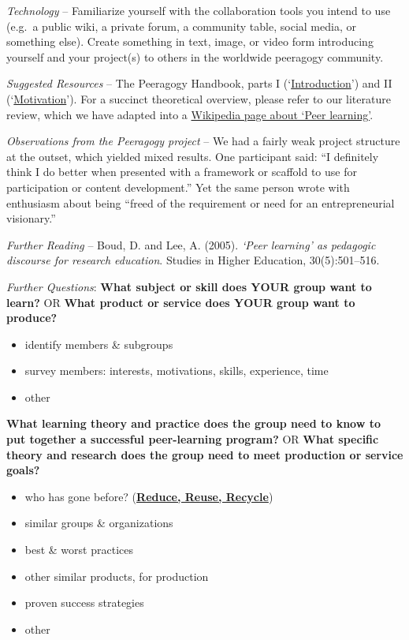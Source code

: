 \emph{Technology} -- Familiarize yourself with the collaboration tools
you intend to use (e.g.~a public wiki, a private forum, a community
table, social media, or something else). Create something in text,
image, or video form introducing yourself and your project(s) to others
in the worldwide peeragogy community.

\emph{Suggested Resources} -- The Peeragogy Handbook, parts I
(`\href{http://peeragogy.org/}{Introduction}') and II
(`\href{http://peeragogy.org/motivation/}{Motivation}'). For a succinct
theoretical overview, please refer to our literature review, which we
have adapted into a
\href{http://en.wikipedia.org/wiki/Peer_learning}{Wikipedia page about
`Peer learning'}.

\emph{Observations from the Peeragogy project} -- We had a fairly weak
project structure at the outset, which yielded mixed results. One
participant said: ``I definitely think I do better when presented with a
framework or scaffold to use for participation or content development.''
Yet the same person wrote with enthusiasm about being ``freed of the
requirement or need for an entrepreneurial visionary.''

\emph{Further Reading} -- Boud, D. and Lee, A. (2005). \emph{`Peer
learning' as pedagogic discourse for research education}. Studies in
Higher Education, 30(5):501--516.

\emph{Further Questions}: \textbf{What subject or skill does YOUR group
want to learn?} OR \textbf{What product or service does YOUR group want
to produce?}

\begin{itemize}
\itemsep1pt\parskip0pt
\item
  identify members \& subgroups
\item
  survey members: interests, motivations, skills, experience, time
\item
  other
\end{itemize}

\textbf{What learning theory and practice does the group need to know to
put together a successful peer-learning program?} OR \textbf{What
specific theory and research does the group need to meet production or
service goals?}

\begin{itemize}
\itemsep1pt\parskip0pt
\item
  who has gone before?
  (\href{http://peeragogy.github.io/practice.html}{\textbf{Reduce,
  Reuse, Recycle}})
\item
  similar groups \& organizations
\item
  best \& worst practices
\item
  other similar products, for production
\item
  proven success strategies
\item
  other
\end{itemize}

